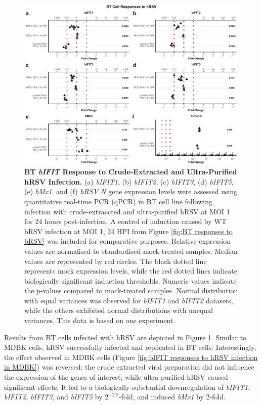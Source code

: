 \begin{figure}
    \centering
    \includegraphics[width=1\linewidth]{07. Chapter 2/Figs/02. Induction/10. bt_hrsv.pdf}
    \caption[BT \textit{bIFIT} Response to Crude-Extracted and Ultra-Purified hRSV Infection.]{\textbf{BT \textit{bIFIT} Response to Crude-Extracted and Ultra-Purified hRSV Infection.} (a) \textit{bIFIT1}, (b) \textit{bIFIT2}, (c) \textit{bIFIT3}, (d) \textit{bIFIT5}, (e) \textit{bMx1}, and (f) \textit{hRSV N} gene expression levels were assessed using quantitative real-time PCR (qPCR) in BT cell line following infection with crude-extraccted and ultra-purified hRSV at MOI 1 for 24 hours post-infection. A control of induction caused by WT bRSV infection at MOI 1, 24 HPI from Figure \ref{fig:BT responses to bRSV} was included for comparative purposes. Relative expression values are normalised to standardised mock-treated samples. Median values are represented by red circles. The black dotted line represents mock expression levels, while the red dotted lines indicate biologically significant induction thresholds. Numeric values indicate the p-values compared to mock-treated samples. Normal distribution with equal variances was observed for \textit{bIFIT1} and \textit{bIFIT2} datasets, while the others exhibited normal distributions with unequal variances. This data is based on one experiment.}
    \label{fig:Bt responses to hRSV}
\end{figure}

Results from BT cells infected with hRSV are depicted in Figure \ref{fig:Bt responses to hRSV}. Similar to MDBK cells, hRSV successfully infected and replicated in BT cells. Interestingly, the effect observed in MDBK cells (Figure \ref{fig:bIFIT responses to hRSV infection in MDBK}) was reversed: the crude extracted viral preparation did not influence the expression of the genes of interest, while ultra-purified hRSV caused significant effects. It led to a biologically substantial downregulation of \textit{bIFIT1}, \textit{bIFIT2}, \textit{bIFIT3}, and \textit{bIFIT5} by \(2^{-2.5}\)-fold, and induced \textit{bMx1} by 2-fold.